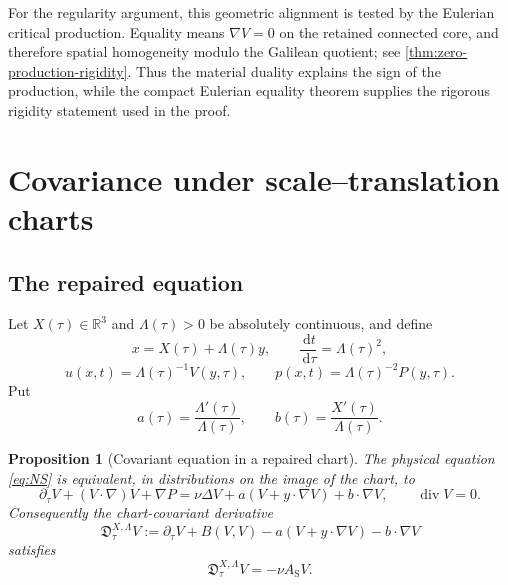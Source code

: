 \documentclass[11pt]{amsart}
\numberwithin{equation}{section}
\theoremstyle{plain}
\newtheorem{proposition}[proposition]{Proposition}
\theoremstyle{definition}
\theoremstyle{remark}
\newcommand{\R}{\mathbb R}
\newcommand{\dd}{\,\mathrm d}
\newcommand{\diver}{\operatorname{div}}
\newcommand{\Dcov}{\mathfrak D}
\begin{document}
For the regularity argument, this geometric alignment is tested by the
Eulerian critical production.  Equality means
\(\nabla V=0\) on the retained connected core, and therefore spatial
homogeneity modulo the Galilean quotient; see
\cref{thm:zero-production-rigidity}.  Thus the material duality explains the
sign of the production, while the compact Eulerian equality theorem supplies
the rigorous rigidity statement used in the proof.

\section{Covariance under scale--translation charts}
\label{sec:charts}

\subsection{The repaired equation}

Let \(X(\tau)\in\R^3\) and \(\Lambda(\tau)>0\) be absolutely continuous,
and define
\begin{equation}\label{eq:chart}
 x=X(\tau)+\Lambda(\tau)y,
 \qquad \frac{\dd t}{\dd\tau}=\Lambda(\tau)^2,
\end{equation}
\begin{equation}\label{eq:chart-fields}
 u(x,t)=\Lambda(\tau)^{-1}V(y,\tau),
 \qquad p(x,t)=\Lambda(\tau)^{-2}P(y,\tau).
\end{equation}
Put
\begin{equation}\label{eq:ab-def}
 a(\tau)=\frac{\Lambda'(\tau)}{\Lambda(\tau)},
 \qquad b(\tau)=\frac{X'(\tau)}{\Lambda(\tau)}.
\end{equation}

\begin{proposition}[Covariant equation in a repaired chart]
\label{prop:chart-equation}
The physical equation \eqref{eq:NS} is equivalent, in distributions on the
image of the chart, to
\begin{equation}\label{eq:renormalized-NS}
 \partial_\tau V+(V\cdot\nabla)V+\nabla P
 =\nu\Delta V+a(V+y\cdot\nabla V)+b\cdot\nabla V,
 \qquad \diver V=0.
\end{equation}
Consequently the chart-covariant derivative
\begin{equation}\label{eq:chart-covariant-derivative}
 \Dcov_\tau^{X,\Lambda}V
 :=\partial_\tau V+B(V,V)
   -a(V+y\cdot\nabla V)-b\cdot\nabla V
\end{equation}
satisfies
\begin{equation}\label{eq:chart-gradient-flow}
 \Dcov_\tau^{X,\Lambda}V=-\nu A_{\mathrm S}V.
\end{equation}
\end{proposition}
\end{document}
